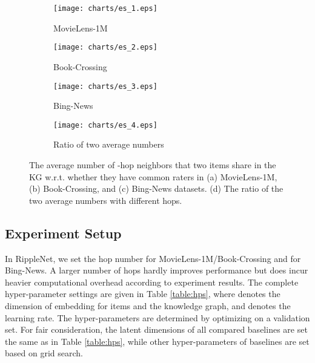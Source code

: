 \documentclass[sigconf]{acmart}
\begin{document}
	\begin{figure}[t]
			\centering
            \begin{subfigure}[b]{0.23\textwidth}
                \texttt{[image: charts/es\_1.eps]}
                \caption{MovieLens-1M}
                \label{fig:es_1}
            \end{subfigure}
            \hfill
            \begin{subfigure}[b]{0.23\textwidth}
                \texttt{[image: charts/es\_2.eps]}
                \caption{Book-Crossing}
                \label{fig:es_2}
            \end{subfigure}
            \hfill
            \begin{subfigure}[b]{0.23\textwidth}
                \texttt{[image: charts/es\_3.eps]}
                \caption{Bing-News}
                \label{fig:es_3}
            \end{subfigure}
            \hfill
            \begin{subfigure}[b]{0.23\textwidth}
                \texttt{[image: charts/es\_4.eps]}
                \caption{Ratio of two average numbers}
                \label{fig:es_4}
            \end{subfigure}
            \caption{The average number of -hop neighbors that two items share in the KG w.r.t. whether they have common raters in (a) MovieLens-1M, (b) Book-Crossing, and (c) Bing-News datasets. (d) The ratio of the two average numbers with different hops.}
            \label{fig:case_study}
        \end{figure}
		
		
	\subsection{Experiment Setup}	
		In RippleNet, we set the hop number  for MovieLens-1M/Book-Crossing and  for Bing-News.
		A larger number of hops hardly improves performance but does incur heavier computational overhead according to experiment results. 
		The complete hyper-parameter settings are given in Table \ref{table:hps}, where  denotes the dimension of embedding for items and the knowledge graph, and  denotes the learning rate.
		The hyper-parameters are determined by optimizing  on a validation set.
		For fair consideration, the latent dimensions of all compared baselines are set the same as in Table \ref{table:hps}, while other hyper-parameters of baselines are set based on grid search.
		
\end{document}
